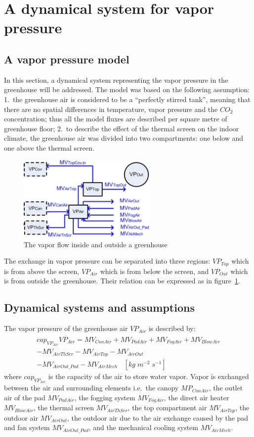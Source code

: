 \documentclass[a4paper]{article}
\begin{document}
\section{A dynamical system for vapor pressure}
\subsection{A vapor pressure model}
In this section, a dynamical system representing the vapor pressure in the greenhouse will be addressed.
The model was based on the following assumption:
1.\ the greenhouse air is considered to be a ``perfectly stirred tank'', meaning that there are no spatial differences in temperature, vapor pressure and the \(CO_2\) concentration; thus all the model fluxes are described per square metre of greenhouse floor;
2.\ to describe the effect of the thermal screen on the indoor climate, the greenhouse air was divided into two compartments: one below and one above the thermal screen.

\begin{figure}[H]
  \centering
  \includegraphics[width=0.6\textwidth]{VP}
  \caption{The vapor flow inside and outside a greenhouse}\label{fig:VP}
\end{figure}

The exchange in vapor pressure can be separated into three regions: \(VP_{Top}\) which is from above the screen, \(VP_{Air}\) which is from below the screen, and \(VP_{Out}\) which is from outside the greenhouse.
Their relation can be expressed as in figure~\ref{fig:VP}.

\subsection{Dynamical systems and assumptions}
The vapor pressure of the greenhouse air \(VP_{Air}\) is described by:
\begin{multline*}
  cap_{VP_{Air}}\dot{VP_{Air}} = MV_{CanAir} + MV_{PadAir} + MV_{FogAir} + MV_{BlowAir} \\
  - MV_{AirThScr} - MV_{AirTop} - MV_{AirOut} \\
  - MV_{AirOut\_Pad} - MV_{AirMech} ~~~~ [kg\;m^{-2}\;s^{-1}]
\end{multline*}
where \(cap_{VP_{Air}}\) is the capacity of the air to store water vapor.
Vapor is exchanged between the air and surrounding elements i.e.\ the canopy \(MP_{CanAir}\), the outlet air of the pad \(MV_{PadAir}\), the fogging system \(MV_{FogAir}\), the direct air heater \(MV_{BlowAir}\), the thermal screen \(MV_{AirThScr}\), the top compartment air \(MV_{AirTop}\), the outdoor air \(MV_{AirOut}\), the outdoor air due to the air exchange caused by the pad and fan system \(MV_{AirOut\_Pad}\), and the mechanical cooling system \(MV_{AirMech}\).
\end{document}
